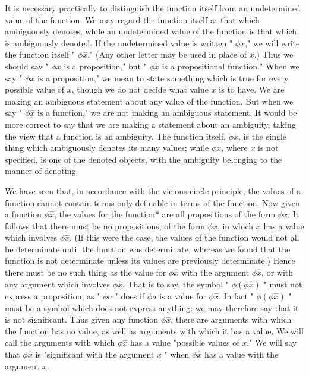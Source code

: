 \documentclass[10pt]{article}
\begin{document}
It is necessary practically to distinguish the function itself from an undetermined value of the function. We may regard the function itself as that which ambiguously denotes, while an undetermined value of the function is that which is ambiguously denoted. If the undetermined value is written " $\phi x$," we will write the function itself " $\phi \hat{x}$." (Any other letter may be used in place of $x$.) Thus we should say " $\phi x$ is a proposition," but " $\phi \hat{x}$ is a propositional function." When we say " $\phi x$ is a proposition," we mean to state something which is true for every possible value of $x$, though we do not decide what value $x$ is to have. We are making an ambiguous statement about any value of the function. But when we say " $\phi \hat{x}$ is a function," we are not making an ambiguous statement. It would be more correct to say that we are making a statement about an ambiguity, taking the view that a function is an ambiguity. The function itself, $\phi \hat{x}$, is the single thing which ambiguously denotes its many values; while $\phi x$, where $x$ is not specified, is one of the denoted objects, with the ambiguity belonging to the manner of denoting.

We have seen that, in accordance with the vicious-circle principle, the values of a function cannot contain terms only definable in terms of the function. Now given a function $\phi \hat{x}$, the values for the function* are all propositions of the form $\phi x$. It follows that there must be no propositions, of the form $\phi x$, in which $x$ has a value which involves $\phi \hat{x}$. (If this were the case, the values of the function would not all be determinate until the function was determinate, whereas we found that the function is not determinate unless its values are previously determinate.) Hence there must be no such thing as the value for $\phi \hat{x}$ with the argument $\phi \hat{x}$, or with any argument which involves $\phi \hat{x}$. That is to say, the symbol " $\phi(\phi \hat{x})$ " must not express a proposition, as " $\phi a$ " does if $\phi a$ is a value for $\phi \hat{x}$. In fact " $\phi(\phi \hat{x})$ " must be a symbol which does not express anything: we may therefore say that it is not significant. Thus given any function $\phi \hat{x}$, there are arguments with which the function has no value, as well as arguments with which it has a value. We will call the arguments with which $\phi \hat{x}$ has a value "possible values of $x$." We will say that $\phi \hat{x}$ is "significant with the argument $x$ " when $\phi \hat{x}$ has a value with the argument $x$.
\end{document}
